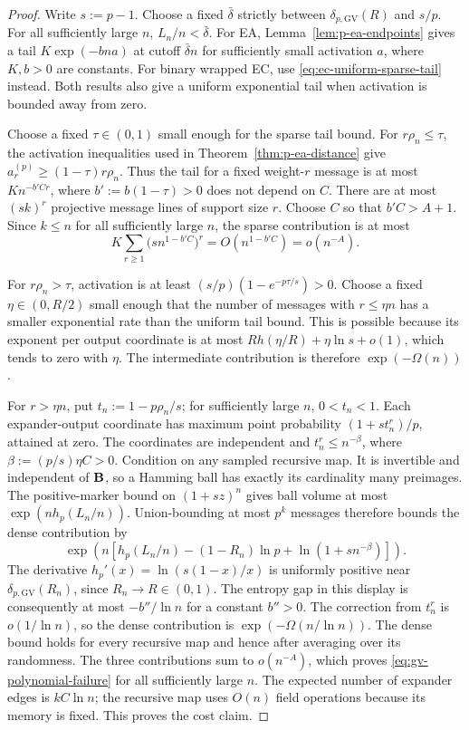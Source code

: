 \begin{proof}
Write $s:=p-1$.  Choose a fixed $\bar\delta$ strictly between
$\delta_{p,\mathrm{GV}}(R)$ and $s/p$.
For all sufficiently large $n$, $L_n/n<\bar\delta$.
For EA, Lemma~\ref{lem:p-ea-endpoints} gives a tail
$K\exp(-bna)$ at cutoff $\bar\delta n$ for sufficiently small activation
$a$, where $K,b>0$ are constants.
For binary wrapped EC, use \eqref{eq:ec-uniform-sparse-tail} instead.
Both results also give a uniform exponential tail when activation is
bounded away from zero.

Choose a fixed $\tau\in(0,1)$ small enough for the sparse tail bound.
For $r\rho_n\leq\tau$, the activation inequalities used in
Theorem~\ref{thm:p-ea-distance} give
$a^{(p)}_r\geq(1-\tau)r\rho_n$.
Thus the tail for a fixed weight-$r$ message is at most
$K n^{-b'Cr}$, where $b':=b(1-\tau)>0$ does not depend on $C$.
There are at most $(sk)^r$ projective message lines of support size $r$.
Choose $C$ so that $b'C>A+1$.  Since $k\leq n$ for all sufficiently large
$n$, the sparse contribution is at most
\[
 K\sum_{r\geq1}\bigl(s n^{1-b'C}\bigr)^r
 =O(n^{1-b'C})=o(n^{-A}).
\]

For $r\rho_n>\tau$, activation is at least
$(s/p)(1-e^{-p\tau/s})>0$.
Choose a fixed $\eta\in(0,R/2)$ small enough that the number of messages with
$r\leq\eta n$ has a smaller exponential rate than the uniform tail bound.
This is possible because its exponent per output coordinate is at most
$R h(\eta/R)+\eta\ln s+o(1)$, which tends to zero with $\eta$.
The intermediate contribution is therefore $\exp(-\Omega(n))$.

For $r>\eta n$, put $t_n:=1-p\rho_n/s$; for sufficiently large $n$,
$0<t_n<1$.
Each expander-output coordinate has maximum point probability
$(1+s t_n^r)/p$, attained at zero.  The coordinates are independent and
$t_n^r\leq n^{-\beta}$, where $\beta:=(p/s)\eta C>0$.
Condition on any sampled recursive map.  It is invertible and independent
of $\mathbf B$, so a Hamming ball has exactly its cardinality many preimages.
The positive-marker bound
on $(1+sz)^n$ gives ball volume at most $\exp(nh_p(L_n/n))$.
Union-bounding at most $p^k$ messages therefore bounds the dense contribution
by
\[
 \exp\!\left(n\left[
 h_p(L_n/n)-(1-R_n)\ln p
 +\ln(1+s n^{-\beta})
 \right]\right).
\]
The derivative $h_p'(x)=\ln(s(1-x)/x)$ is uniformly positive near
$\delta_{p,\mathrm{GV}}(R_n)$, since $R_n\to R\in(0,1)$.
The entropy gap in this display is consequently at most $-b''/\ln n$
for a constant $b''>0$.
The correction from $t_n^r$ is $o(1/\ln n)$, so the dense contribution is
$\exp(-\Omega(n/\ln n))$.
The dense bound holds for every recursive map and hence after averaging over
its randomness.  The three contributions sum to $o(n^{-A})$, which proves
\eqref{eq:gv-polynomial-failure} for all sufficiently large $n$.
The expected number of expander edges is $kC\ln n$; the recursive map uses
$O(n)$ field operations because its memory is fixed.  This proves the cost
claim.
\end{proof}

